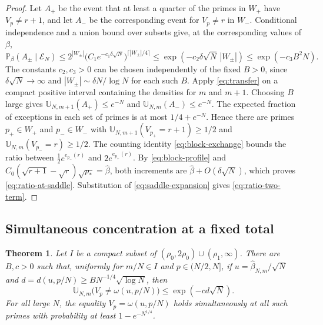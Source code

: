 \documentclass[11pt]{amsart}
\newtheorem{theorem}{Theorem}[section]
\theoremstyle{remark}
\begin{document}
\begin{proof}
Let \(A_+\) be the event that at least a quarter of the primes in \(W_+\)
have \(V_p\ne r+1\), and let \(A_-\) be the corresponding event for
\(V_p\ne r\) in \(W_-\). Conditional independence and a union bound
over subsets give, at the corresponding values of \(\beta\),
\[
 \mathbb P_\beta(A_\pm\mid \mathcal E_N)
 \le 2^{|W_\pm|}
   \bigl(C_1e^{-c_1\delta\sqrt N}\bigr)^{\lceil|W_\pm|/4\rceil}
 \le \exp(-c_2\delta\sqrt N\,|W_\pm|)
 \le \exp(-c_3 B^2 N).
\]
The constants \(c_2,c_3>0\) can be chosen independently of the fixed
\(B>0\), since \(\delta\sqrt N\to\infty\) and
\(|W_\pm|\sim\delta N/\log N\) for each such \(B\).
Apply \eqref{eq:transfer} on a compact positive interval containing
the densities for \(m\) and \(m+1\). Choosing \(B\) large gives
\(\mathbb U_{N,m+1}(A_+)\le e^{-N}\) and
\(\mathbb U_{N,m}(A_-)\le e^{-N}\).
The expected fraction of exceptions in each set of primes is at most
\(1/4+e^{-N}\). Hence there are primes \(p_+\in W_+\) and \(p_-\in W_-\)
with \(\mathbb U_{N,m+1}(V_{p_+}=r+1)\ge1/2\) and
\(\mathbb U_{N,m}(V_{p_-}=r)\ge1/2\). The counting identity
\eqref{eq:block-exchange} bounds the ratio between
\(\tfrac12 e^{e_{p_-}(r)}\) and \(2e^{e_{p_+}(r)}\).
By \eqref{eq:block-profile} and
\(C_0(\sqrt{r+1}-\sqrt r)\sqrt{p_*}=\widehat\beta\), both increments
are \(\widehat\beta+O(\delta\sqrt N)\), which proves
\eqref{eq:ratio-at-saddle}. Substitution of \eqref{eq:saddle-expansion}
gives \eqref{eq:ratio-two-term}.
\end{proof}

\subsection{Simultaneous concentration at a fixed total}

\begin{theorem}
\label{thm:top-concentration}
Let \(I\) be a compact subset of \((\rho_0,2\rho_0)\cup(\rho_1,\infty)\). There are \(B,c>0\)
such that, uniformly for \(m/N\in I\) and \(p\in(N/2,N]\), if
\(u=\widehat\beta_{N,m}/\sqrt N\) and
\(d=d(u,p/N)\ge B N^{-1/4}\sqrt{\log N}\), then
\[
 \mathbb U_{N,m}\bigl(V_p\ne\omega(u,p/N)\bigr)
 \le \exp(-c d\sqrt N).
\]
For all large \(N\), the equality \(V_p=\omega(u,p/N)\) holds
simultaneously at all such primes with probability at least
\(1-e^{-N^{1/4}}\).
\end{theorem}
\end{document}

